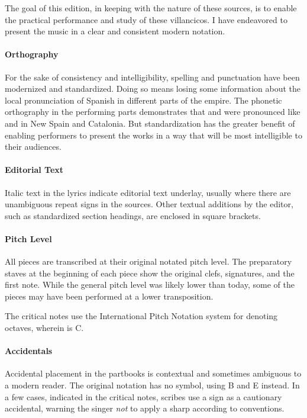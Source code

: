 The goal of this edition, in keeping with the nature of these sources, is to enable the practical performance and study of these villancicos.
I have endeavored to present the music in a clear and consistent modern notation.


\paragraph{Orthography}
For the sake of consistency and intelligibility, spelling and punctuation have been modernized and standardized.
Doing so means losing some information about the local pronunciation of Spanish in different parts of the empire.
The phonetic orthography in the performing parts demonstrates that  and  were pronounced like  and  in New Spain and Catalonia.
But standardization has the greater benefit of enabling performers to present the works in a way that will be most intelligible to their audiences.

\paragraph{Editorial Text}
Italic text in the lyrics indicate editorial text underlay, usually where there are unambiguous repeat signs in the sources.
Other textual additions by the editor, such as standardized section headings, are enclosed in square brackets.

\paragraph{Pitch Level}
All pieces are transcribed at their original notated pitch level.
The preparatory staves at the beginning of each piece show the original clefs, signatures, and the first note.
While the  general pitch level was likely lower than today, some of the pieces may have been performed at a lower transposition.

The critical notes use the International Pitch Notation system for denoting octaves, wherein  is C.

\paragraph{Accidentals}
Accidental placement in the partbooks is contextual and sometimes ambiguous to a modern reader.
The original notation has no \na{} symbol, using B\sh{} and E\sh{} instead.
In a few cases, indicated in the critical notes, scribes use a \sh{} sign as a cautionary accidental, warning the singer \emph{not} to apply a sharp according to  conventions.%
  \autocites{Harran:Cautionary1}{Harran:Cautionary2}

